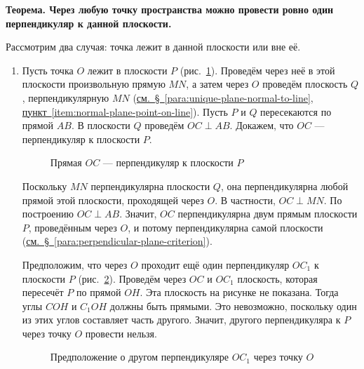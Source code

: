  \textbf{Теорема. Через любую точку пространства можно провести ровно один перпендикуляр к данной плоскости.}

Рассмотрим два случая: точка лежит в данной плоскости или вне её.

\begin{enumerate}[label=\arabic*),ref=\arabic*]
    \item\label{item:normal-line-point-in-plane} Пусть точка \(O\) лежит в плоскости \(P\) (рис.~\ref{fig:kiselev-stereo-308}). Проведём через неё в этой плоскости произвольную прямую \(MN\), а затем через \(O\) проведём плоскость \(Q\), перпендикулярную \(MN\) (\hyperref[item:normal-plane-point-on-line]{см.~§~\ref*{para:unique-plane-normal-to-line}, пункт~\ref*{item:normal-plane-point-on-line}}). Пусть \(P\) и \(Q\) пересекаются по прямой \(AB\). В плоскости \(Q\) проведём \(OC\perp AB\). Докажем, что \(OC\) --- перпендикуляр к плоскости \(P\).

    \begin{figure}[htbp]
        \centering
        \renewcommand{\thefigure}{308}
        \captionsetup{name=Рис.,labelsep=period}
        
        \caption{Прямая \(OC\) --- перпендикуляр к плоскости \(P\)}\label{fig:kiselev-stereo-308}
    \end{figure}

    Поскольку \(MN\) перпендикулярна плоскости \(Q\), она перпендикулярна любой прямой этой плоскости, проходящей через \(O\). В частности, \(OC\perp MN\). По построению \(OC\perp AB\). Значит, \(OC\) перпендикулярна двум прямым плоскости \(P\), проведённым через \(O\), и потому перпендикулярна самой плоскости (\hyperref[para:perpendicular-plane-criterion]{см.~§~\ref*{para:perpendicular-plane-criterion}}).

    Предположим, что через \(O\) проходит ещё один перпендикуляр \(OC_1\) к плоскости \(P\) (рис.~\ref{fig:kiselev-stereo-309}).
    Проведём через \(OC\) и \(OC_1\) плоскость, которая пересечёт \(P\) по прямой \(OH\). Эта плоскость на рисунке не показана. Тогда углы \(COH\) и \(C_1OH\) должны быть прямыми. Это невозможно, поскольку один из этих углов составляет часть другого. Значит, другого перпендикуляра к \(P\) через точку \(O\) провести нельзя.

    \begin{figure}[htbp]
        \centering
        \renewcommand{\thefigure}{309}
        \captionsetup{name=Рис.,labelsep=period}
        
        \caption{Предположение о другом перпендикуляре \(OC_1\) через точку \(O\)}\label{fig:kiselev-stereo-309}
    \end{figure}


\end{enumerate}
